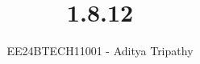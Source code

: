 \documentclass[journal]{IEEEtran}
\begin{document}

\vspace{3cm}

\title{1.8.12}
\author{EE24BTECH11001 - Aditya Tripathy
}
 \maketitle
{\let\newpage\relax\maketitle}

\renewcommand{\thefigure}{\theenumi}
\renewcommand{\thetable}{\theenumi}
\setlength{\intextsep}{10pt} %


\renewcommand{\thetable}{\theenumi}
\end{document}
